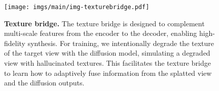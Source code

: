 \begin{figure}
    \centering
    \texttt{[image: imgs/main/img-texturebridge.pdf]}
    \caption{\textbf{Texture bridge.} The texture bridge is designed to complement multi-scale features from the encoder to the decoder, enabling high-fidelity synthesis. For training, we intentionally degrade the texture of the target view with the diffusion model, simulating a degraded view with hallucinated textures. This facilitates the texture bridge to learn how to adaptively fuse information from the splatted view and the diffusion outputs.}
    \label{fig:main-texturebridge}
\end{figure}

